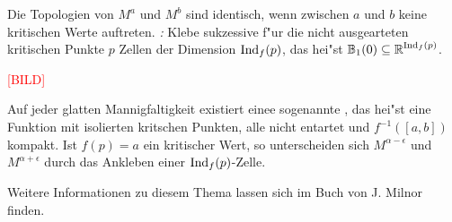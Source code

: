 \begin{center}
\end{center}
Die Topologien von $M^a$ und $M^b$ sind identisch, wenn zwischen $a$
und $b$ keine kritischen Werte auftreten.
\emph{:} Klebe sukzessive f"ur die nicht
ausgearteten kritischen Punkte $p$ Zellen der Dimension $\operatorname{Ind}_f(p)$,
das hei"st $\operatorname{\mathbb{B}}_1(0) \subseteq \operatorname{\mathbb{R}}^{\operatorname{Ind}_f(p)}$.
\begin{center}\textcolor{red}{[BILD]}\end{center}
Auf jeder glatten Mannigfaltigkeit existiert einee sogenannte
, das hei"st eine Funktion mit isolierten
kritschen Punkten, alle nicht entartet und $f^{-1}([a,b])$
kompakt. Ist $f(p) = a$ ein kritischer Wert, so unterscheiden sich
$M^{\alpha - \epsilon}$ und $M^{\alpha + \epsilon}$ durch das Ankleben
einer $\operatorname{Ind}_f(p)$-Zelle.

Weitere Informationen zu diesem Thema lassen sich im Buch  von J. Milnor \cite{milnor1963morsetheo} finden.

